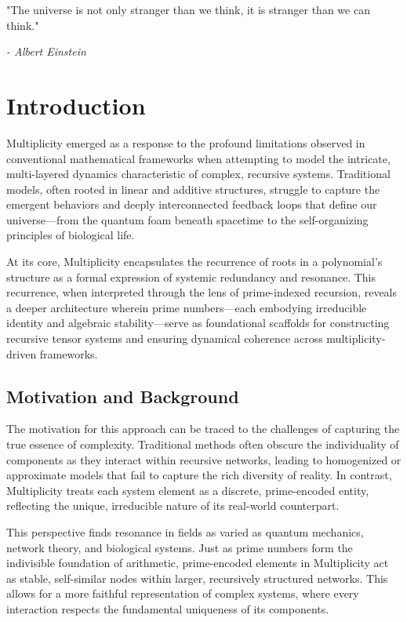 \documentclass{article}
\theoremstyle{plain}
\begin{document}
\epigraph{"The universe is not only stranger than we think, it is stranger than we can think."} 
{\textit{- Albert Einstein}}

\section{Introduction}

Multiplicity emerged as a response to the profound limitations observed in conventional mathematical frameworks when attempting to model the intricate, multi-layered dynamics characteristic of complex, recursive systems. Traditional models, often rooted in linear and additive structures, struggle to capture the emergent behaviors and deeply interconnected feedback loops that define our universe—from the quantum foam beneath spacetime to the self-organizing principles of biological life.

At its core, Multiplicity encapsulates the recurrence of roots in a polynomial's structure as a formal expression of systemic redundancy and resonance. This recurrence, when interpreted through the lens of prime-indexed recursion, reveals a deeper architecture wherein prime numbers—each embodying irreducible identity and algebraic stability—serve as foundational scaffolds for constructing recursive tensor systems and ensuring dynamical coherence across multiplicity-driven frameworks.

\subsection{Motivation and Background}

The motivation for this approach can be traced to the challenges of capturing the true essence of complexity. Traditional methods often obscure the individuality of components as they interact within recursive networks, leading to homogenized or approximate models that fail to capture the rich diversity of reality. In contrast, Multiplicity treats each system element as a discrete, prime-encoded entity, reflecting the unique, irreducible nature of its real-world counterpart.

This perspective finds resonance in fields as varied as quantum mechanics, network theory, and biological systems. Just as prime numbers form the indivisible foundation of arithmetic, prime-encoded elements in Multiplicity act as stable, self-similar nodes within larger, recursively structured networks. This allows for a more faithful representation of complex systems, where every interaction respects the fundamental uniqueness of its components.
\end{document}
